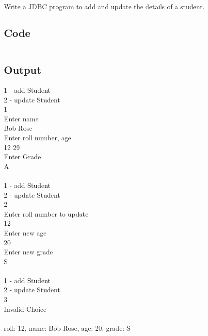 \documentclass[../main.tex]{subfiles}
\begin{document}
Write a JDBC program to add and update the details of a student.

\subsection{Code}
\inputminted[frame=lines, breaklines, breakanywhere, numberblanklines=false]{java}{./programs/prog23/Student.java}

\newpage
\subsection{Output}
1 - add Student \\
2 - update Student \\
1 \\
Enter name \\
Bob Rose \\
Enter roll number, age \\
12 29 \\
Enter Grade \\
A \\
\\
1 - add Student \\
2 - update Student \\
2 \\
Enter roll number to update \\
12 \\
Enter new age \\
20 \\
Enter new grade \\
S \\
\\
1 - add Student \\
2 - update Student \\
3 \\
Invalid Choice \\
\\
roll: 12, name: Bob Rose, age: 20, grade: S \\
\end{document}
